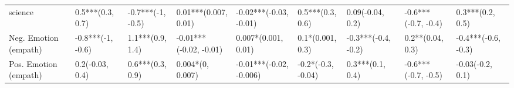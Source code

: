 \begin{tabular}{lllllllll}
science               &     0.5***(0.3, 0.7) &  -0.7***(-1, -0.5) &      0.01***(0.007, 0.01) &   -0.02***(-0.03, -0.01) &      0.5***(0.3, 0.6) &     0.09(-0.04, 0.2) &  -0.6***(-0.7, -0.4) &     0.3***(0.2, 0.5) \\
Neg. Emotion (empath) &    -0.8***(-1, -0.6) &   1.1***(0.9, 1.4) &    -0.01***(-0.02, -0.01) &      0.007*(0.001, 0.01) &      0.1*(0.001, 0.3) &  -0.3***(-0.4, -0.2) &     0.2**(0.04, 0.3) &  -0.4***(-0.6, -0.3) \\
Pos. Emotion (empath) &      0.2(-0.03, 0.4) &   0.6***(0.3, 0.9) &          0.004*(0, 0.007) &  -0.01***(-0.02, -0.006) &    -0.2*(-0.3, -0.04) &     0.3***(0.1, 0.4) &  -0.6***(-0.7, -0.5) &     -0.03(-0.2, 0.1) \\
\bottomrule
\end{tabular}
